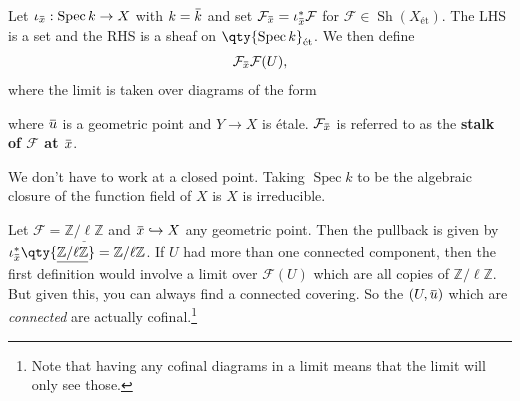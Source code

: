 \begin{definition}[Pullbacks]

Let
\(\iota_{\mkern 1.5mu\overline{\mkern-1.5mux\mkern-1.5mu}\mkern 1.5mu}: \operatorname{Spec}k \to X\)
with
\(k = \mkern 1.5mu\overline{\mkern-1.5muk\mkern-1.5mu}\mkern 1.5mu\) and
set
\(\mathcal{F}_{\mkern 1.5mu\overline{\mkern-1.5mux\mkern-1.5mu}\mkern 1.5mu} = \iota_{\mkern 1.5mu\overline{\mkern-1.5mux\mkern-1.5mu}\mkern 1.5mu}^* \mathcal{F}\)
for \(\mathcal{F}\in {\operatorname{Sh}}(X_{\text{ét}})\). The LHS is a
set and the RHS is a sheaf on
\(\qty{\operatorname{Spec}k}_{\text{ét}}\). We then define
\begin{align*}  
\mathcal{F}_{\mkern 1.5mu\overline{\mkern-1.5mux\mkern-1.5mu}\mkern 1.5mu} \def \varinjlim_{(U, u)} \mathcal{F}(U)
,\end{align*}
where the limit is taken over diagrams of the form

where \(\mkern 1.5mu\overline{\mkern-1.5muu\mkern-1.5mu}\mkern 1.5mu\)
is a geometric point and \(Y\to X\) is étale.
\(\mathcal{F}_{\mkern 1.5mu\overline{\mkern-1.5mux\mkern-1.5mu}\mkern 1.5mu}\)
is referred to as the \textbf{stalk of \(\mathcal{F}\) at
\(\mkern 1.5mu\overline{\mkern-1.5mux\mkern-1.5mu}\mkern 1.5mu\)}.

\end{definition}

\begin{remark}

We don't have to work at a closed point. Taking \(\operatorname{Spec}k\)
to be the algebraic closure of the function field of \(X\) is \(X\) is
irreducible.

\end{remark}

\begin{example}[?]

Let \(\mathcal{F} = \underline{\mathbb{Z}/\ell\mathbb{Z}}\) and
\(\mkern 1.5mu\overline{\mkern-1.5mux\mkern-1.5mu}\mkern 1.5mu\hookrightarrow X\)
any geometric point. Then the pullback is given by
\(\iota_{\mkern 1.5mu\overline{\mkern-1.5mux\mkern-1.5mu}\mkern 1.5mu}^* \qty{\underline{\mathbb{Z}/\ell\mathbb{Z}}} = \mathbb{Z}/\ell\mathbb{Z}\).
If \(U\) had more than one connected component, then the first
definition would involve a limit over \(\mathcal{F}(U)\) which are all
copies of \(\mathbb{Z}/\ell\mathbb{Z}\). But given this, you can always
find a connected covering. So the
\((U, \mkern 1.5mu\overline{\mkern-1.5muu\mkern-1.5mu}\mkern 1.5mu)\)
which are \emph{connected} are actually cofinal.\footnote{Note that
  having any cofinal diagrams in a limit means that the limit will only
  see those.}

\end{example}

